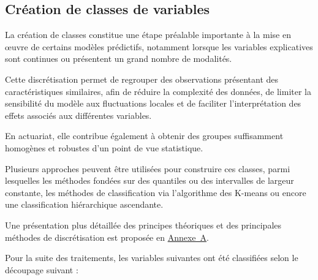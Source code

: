 \subsection{Création de classes de variables}
\label{subsec:création-classes}

La création de classes constitue une étape préalable importante à la mise en œuvre de certains modèles prédictifs, notamment lorsque les variables explicatives sont continues ou présentent un grand nombre de modalités.

Cette discrétisation permet de regrouper des observations présentant des caractéristiques similaires, afin de réduire la complexité des données, de limiter la sensibilité du modèle aux fluctuations locales et de faciliter l'interprétation des effets associés aux différentes variables.

En actuariat, elle contribue également à obtenir des groupes suffisamment homogènes et robustes d'un point de vue statistique.

Plusieurs approches peuvent être utilisées pour construire ces classes, parmi lesquelles les méthodes fondées sur des quantiles ou des intervalles de largeur constante, les méthodes de classification via l'algorithme des K-means ou encore une classification hiérarchique ascendante.

Une présentation plus détaillée des principes théoriques et des principales méthodes de discrétisation est proposée en \hyperref[sec:methodes-classification]{Annexe~A}.

Pour la suite des traitements, les variables suivantes ont été classifiées selon le découpage suivant :

